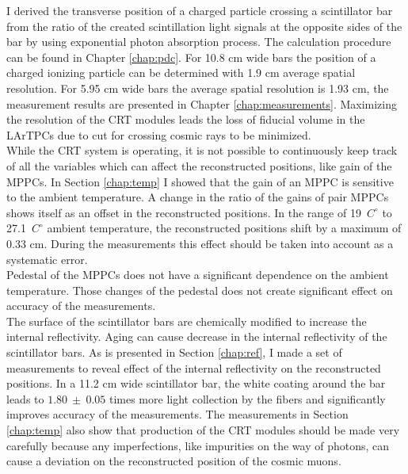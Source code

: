 \documentclass[a4paper]{article}\linespread{1.4}
\begin{document}
I derived the transverse position of a charged particle crossing a scintillator bar from the ratio of the created scintillation light signals at the opposite sides of the bar by using exponential photon absorption process. The calculation procedure can be found in Chapter \ref{chap:pdc}.
For 10.8 cm wide bars the position of a charged ionizing particle can be determined with 1.9 cm average spatial resolution. For 5.95 cm wide bars the average spatial resolution is 1.93 cm, the measurement results are presented in Chapter \ref{chap:measurements}. 
Maximizing the resolution of the CRT modules 
leads the loss of fiducial volume in the LArTPCs due to cut for crossing cosmic rays to be minimized.
\\While the CRT system is operating, it is not possible to continuously keep track of all the variables which can affect the reconstructed positions, like gain of the MPPCs.
In Section \ref{chap:temp} I showed that the gain of an MPPC is sensitive to the ambient temperature.
A change in the ratio of the gains of pair MPPCs shows itself as an offset in the reconstructed positions. 
In the range of 19~$C^{\circ}$ to 27.1~$C^{\circ}$ ambient temperature, the reconstructed positions shift by a maximum of 0.33 cm. 
During the measurements this effect should be taken into account as a systematic error. 
\\Pedestal of the MPPCs does not have a significant dependence on the ambient temperature. Those changes of the pedestal does not create significant effect on accuracy of the measurements.
\\The surface of the scintillator bars are chemically modified to increase the internal reflectivity.
Aging can cause decrease in the internal reflectivity of the scintillator bars. As is presented in Section \ref{chap:ref}, I made a set of measurements to reveal effect of the internal reflectivity on the reconstructed positions.
In a 11.2 cm wide scintillator bar, the white coating around the bar leads to $1.80~\pm~0.05$ times more light collection by the fibers and significantly improves accuracy of the measurements.
The measurements in Section \ref{chap:temp} also show that production of the CRT modules should be made very carefully because any imperfections, like impurities on the way of photons, can cause a deviation on the reconstructed position of the cosmic muons.
\end{document}
